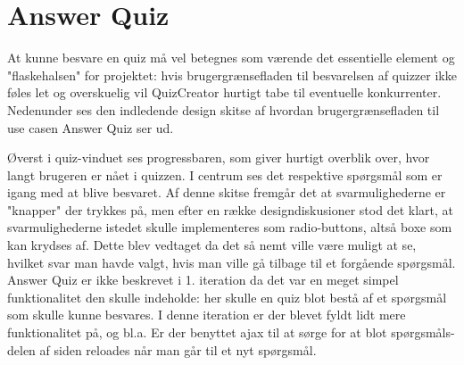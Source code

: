 \section{Answer Quiz}

At kunne besvare en quiz må vel betegnes som værende det essentielle element og "flaskehalsen" for projektet: hvis brugergrænsefladen til besvarelsen af quizzer ikke føles let og overskuelig vil QuizCreator hurtigt tabe til eventuelle konkurrenter. \\
Nedenunder ses den indledende design skitse af hvordan brugergrænsefladen til use casen Answer Quiz ser ud. \\


Øverst i quiz-vinduet ses progressbaren, som giver hurtigt overblik over, hvor langt brugeren er nået i quizzen. I centrum ses det respektive spørgsmål som er igang med at blive besvaret. Af denne skitse fremgår det at svarmulighederne er "knapper" der trykkes på, men efter en række designdiskusioner stod det klart, at svarmulighederne istedet skulle implementeres som radio-buttons, altså boxe som kan krydses af. Dette blev vedtaget da det så nemt ville være muligt at se, hvilket svar man havde valgt, hvis man ville gå tilbage til et forgående spørgsmål.
Answer Quiz er ikke beskrevet i 1. iteration da det var en meget simpel funktionalitet den skulle indeholde: her skulle en quiz blot bestå af et spørgsmål som skulle kunne besvares. 
I denne iteration er der blevet fyldt lidt mere funktionalitet på, og bl.a. Er der benyttet ajax til at sørge for at blot spørgsmåls-delen af siden reloades når man går til et nyt spørgsmål. 
